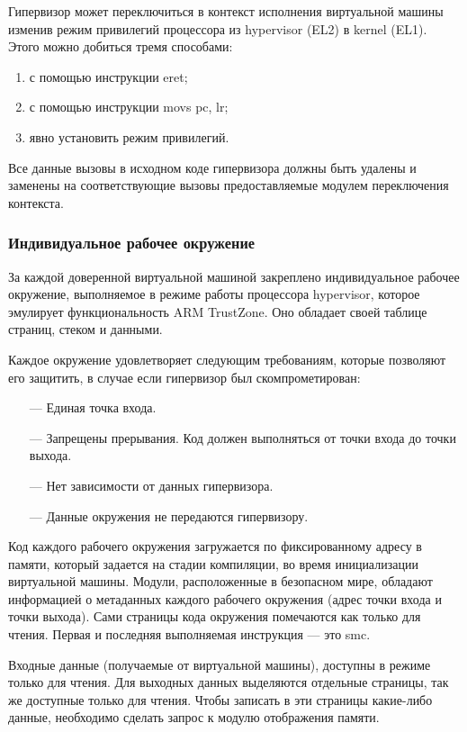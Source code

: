 Гипервизор может переключиться в контекст исполнения виртуальной машины изменив режим привилегий процессора из hypervisor (EL2) в kernel (EL1). Этого можно добиться тремя способами:

\begin{enumerate}[label*=\arabic*.]
	\item с помощью инструкции eret;
	\item с помощью инструкции movs pc, lr;
	\item явно установить режим привилегий.
\end{enumerate}

Все данные вызовы в исходном коде гипервизора должны быть удалены и заменены на соответствующие вызовы предоставляемые модулем переключения контекста.

\subsubsection{Индивидуальное рабочее окружение}

За каждой доверенной виртуальной машиной закреплено индивидуальное рабочее окружение, выполняемое в режиме работы процессора hypervisor, которое эмулирует функциональность ARM TrustZone. Оно обладает своей таблице страниц, стеком и данными.

Каждое окружение удовлетворяет следующим требованиям, которые позволяют его защитить, в случае если гипервизор был скомпрометирован:

\begin{itemize}
	\item [---] Единая точка входа.
	\item [---] Запрещены прерывания. Код должен выполняться от точки входа до точки выхода.
	\item [---] Нет зависимости от данных гипервизора.
	\item [---] Данные окружения не передаются гипервизору.
\end{itemize}

Код каждого рабочего окружения загружается по фиксированному адресу в памяти, который задается на стадии компиляции, во время инициализации виртуальной машины. Модули, расположенные в безопасном мире, обладают информацией о метаданных каждого рабочего окружения (адрес точки входа и точки выхода). Сами страницы кода окружения помечаются как только для чтения. Первая и последняя выполняемая инструкция --- это smc. 

Входные данные (получаемые от виртуальной машины), доступны в режиме только для чтения. Для выходных данных выделяются отдельные страницы, так же доступные только для чтения. Чтобы записать в эти страницы какие-либо данные, необходимо сделать запрос к модулю отображения памяти. 

